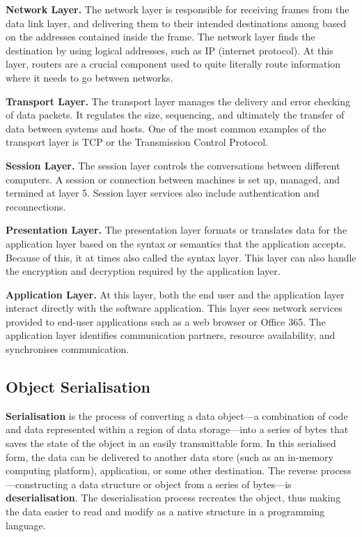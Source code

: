 \documentclass[../report.tex]{subfiles}
\begin{document}
\textbf{Network Layer.} The network layer is responsible for receiving frames from the data link layer, and delivering them to their intended destinations among based on the addresses contained inside the frame. The network layer finds the destination by using logical addresses, such as IP (internet protocol). At this layer, routers are a crucial component used to quite literally route information where it needs to go between networks.

\textbf{Transport Layer.} The transport layer manages the delivery and error checking of data packets. It regulates the size, sequencing, and ultimately the transfer of data between systems and hosts. One of the most common examples of the transport layer is TCP or the Transmission Control Protocol.

\textbf{Session Layer.} The session layer controls the conversations between different computers. A session or connection between machines is set up, managed, and termined at layer 5. Session layer services also include authentication and reconnections.

\textbf{Presentation Layer.} The presentation layer formats or translates data for the application layer based on the syntax or semantics that the application accepts. Because of this, it at times also called the syntax layer. This layer can also handle the encryption and decryption required by the application layer.

\textbf{Application Layer.} At this layer, both the end user and the application layer interact directly with the software application. This layer sees network services provided to end-user applications such as a web browser or Office 365. The application layer identifies communication partners, resource availability, and synchronises communication.


\pagebreak

\subsection{Object Serialisation} %

\textbf{Serialisation} is the process of converting a data object—a combination of code and data represented within a region of data storage—into a series of bytes that saves the state of the object in an easily transmittable form. In this serialised form, the data can be delivered to another data store (such as an in-memory computing platform), application, or some other destination. The reverse process—constructing a data structure or object from a series of bytes—is \textbf{deserialisation}. The deserialisation process recreates the object, thus making the data easier to read and modify as a native structure in a programming language.
\end{document}
